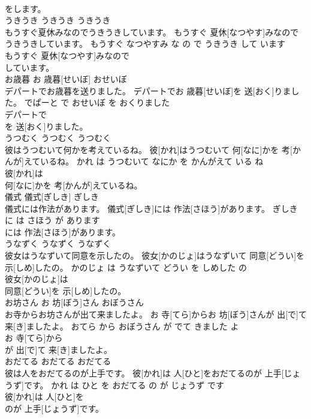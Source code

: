 \documentclass[8pt]{extreport}
\begin{document}
\begin{CJK}{UTF8}{min}
\\	をします。			
\\	うきうき	うきうき	うきうき	
\\	もうすぐ夏休みなのでうきうきしています。	もうすぐ 夏休[なつやす]みなのでうきうきしています。	もうすぐ なつやすみ な の で うきうき して います	
\\	もうすぐ 夏休[なつやす]みなので
\\	しています。			
\\	お歳暮	お 歳暮[せいぼ]	おせいぼ	
\\	デパートでお歳暮を送りました。	デパートでお 歳暮[せいぼ]を 送[おく]りました。	でぱーと で おせいぼ を おくりました	
\\	デパートで
\\	を 送[おく]りました。			
\\	うつむく	うつむく	うつむく	
\\	彼はうつむいて何かを考えているね。	彼[かれ]はうつむいて 何[なに]かを 考[かんが]えているね。	かれ は うつむいて なにか を かんがえて いる ね	
\\	彼[かれ]は
\\	何[なに]かを 考[かんが]えているね。			
\\	儀式	儀式[ぎしき]	ぎしき	
\\	儀式には作法があります。	儀式[ぎしき]には 作法[さほう]があります。	ぎしき に は さほう が あります	
\\	には 作法[さほう]があります。			
\\	うなずく	うなずく	うなずく	
\\	彼女はうなずいて同意を示したの。	彼女[かのじょ]はうなずいて 同意[どうい]を 示[しめ]したの。	かのじょ は うなずいて どうい を しめした の	
\\	彼女[かのじょ]は
\\	同意[どうい]を 示[しめ]したの。			
\\	お坊さん	お 坊[ぼう]さん	おぼうさん	
\\	お寺からお坊さんが出て来ましたよ。	お 寺[てら]からお 坊[ぼう]さんが 出[で]て 来[き]ましたよ。	おてら から おぼうさん が でて きました よ	
\\	お 寺[てら]から
\\	が 出[で]て 来[き]ましたよ。			
\\	おだてる	おだてる	おだてる	
\\	彼は人をおだてるのが上手です。	彼[かれ]は 人[ひと]をおだてるのが 上手[じょうず]です。	かれ は ひと を おだてる の が じょうず です	
\\	彼[かれ]は 人[ひと]を
\\	のが 上手[じょうず]です。			

\end{CJK}
\end{document}
